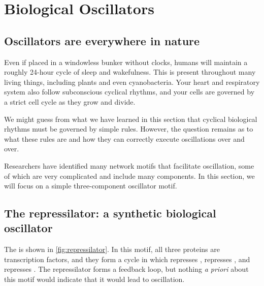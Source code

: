 \FloatBarrier
{}

\section{Biological Oscillators}
\label{sec:biological_oscillators}

\subsection{Oscillators are everywhere in nature}

Even if placed in a windowless bunker without clocks, humans will maintain a roughly 24-hour cycle of sleep and wakefulness. This  is present throughout many living things, including plants and even cyanobacteria. Your heart and respiratory system also follow subconscious cyclical rhythms, and your cells are governed by a strict cell cycle as they grow and divide.

We might guess from what we have learned in this section that cyclical biological rhythms must be governed by simple rules. However, the question remains as to what these rules are and how they can correctly execute oscillations over and over.

Researchers have identified many network motifs that facilitate oscillation, some of which are very complicated and include many components. In this section, we will focus on a simple three-component oscillator motif.

\FloatBarrier
{}
\subsection{The repressilator: a synthetic biological oscillator}

The  is shown in \autoref{fig:repressilator}. In this motif, all three proteins are transcription factors, and they form a cycle in which  represses ,  represses , and  represses . The repressilator forms a feedback loop, but nothing \textit{a priori} about this motif would indicate that it would lead to oscillation.\\

